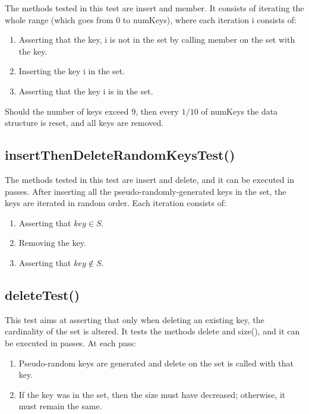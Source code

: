 The methods tested in this test are {\ttfamily insert} and {\ttfamily member}. It consists of iterating the whole range (which goes from $0$ to {\ttfamily numKeys}), where each iteration {\ttfamily i} consists of:
\begin{enumerate}
    \item
    Asserting that the key, {\ttfamily i} is not in the set by calling {\ttfamily member} on the set with the key.
    \item
    Inserting the key {\ttfamily i} in the set.
    \item
    Asserting that the key {\ttfamily i} is in the set.
\end{enumerate}
Should the number of keys exceed 9, then every $1/10$ of {\ttfamily numKeys} the data structure is reset, and all keys are removed.

\subsection{{\ttfamily insertThenDeleteRandomKeysTest()}}

The methods tested in this test are {\ttfamily insert} and {\ttfamily delete}, and it can be executed in passes. After inserting all the pseudo-randomly-generated keys in the set, the keys are iterated in random order. Each iteration consists of:
\begin{enumerate}
    \item
    Asserting that $key \in S$.
    \item
    Removing the key.
    \item
    Asserting that $key \not\in S$.
\end{enumerate}

\subsection{{\ttfamily deleteTest()}}

This test aims at asserting that only when deleting an existing key, the cardinality of the set is altered. It tests the methods {\ttfamily delete} and {\ttfamily size()}, and it can be executed in passes. At each pass:
\begin{enumerate}
    \item
    Pseudo-random keys are generated and delete on the set is called with that key.
    \item
    If the key was in the set, then the size must have decreased; otherwise, it must remain the same.
\end{enumerate}

